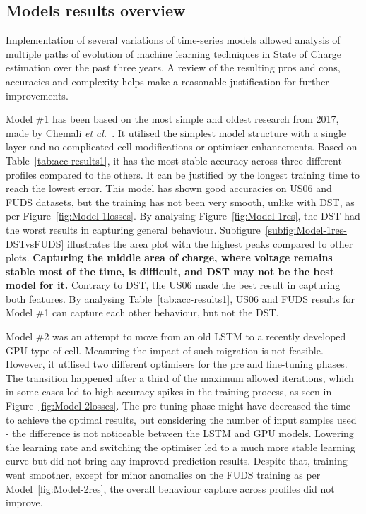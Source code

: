 %
%
\subsection{Models results overview}
Implementation of several variations of time-series models allowed analysis of multiple paths of evolution of machine learning techniques in State of Charge estimation over the past three years.
A review of the resulting pros and cons, accuracies and complexity helps make a reasonable justification for further improvements.

%
%
Model \#1 has been based on the most simple and oldest research from 2017, made by Chemali \textit{et al.}~\cite{Chemali2017}.
It utilised the simplest model structure with a single layer and no complicated cell modifications or optimiser enhancements.
Based on Table~\ref{tab:acc-results1}, it has the most stable accuracy across three different profiles compared to the others.
It can be justified by the longest training time to reach the lowest error.
This model has shown good accuracies on US06 and FUDS datasets, but the training has not been very smooth, unlike with DST, as per Figure~\ref{fig:Model-1losses}.
By analysing Figure~\ref{fig:Model-1res}, the DST had the worst results in capturing general behaviour.
Subfigure~\ref{subfig:Model-1res-DSTvsFUDS} illustrates the area plot with the highest peaks compared to other plots.
\textbf{Capturing the middle area of charge, where voltage remains stable most of the time, is difficult, and DST may not be the best model for it.}
Contrary to DST, the US06 made the best result in capturing both features.
By analysing Table~\ref{tab:acc-results1}, US06 and FUDS results for Model \#1 can capture each other behaviour, but not the DST.

%
%
Model \#2 was an attempt to move from an old LSTM to a recently developed GPU type of cell.
Measuring the impact of such migration is not feasible.
However, it utilised two different optimisers for the pre and fine-tuning phases.
The transition happened after a third of the maximum allowed iterations, which in some cases led to high accuracy spikes in the training process, as seen in Figure~\ref{fig:Model-2losses}.
The pre-tuning phase might have decreased the time to achieve the optimal results, but considering the number of input samples used - the difference is not noticeable between the LSTM and GPU models.
Lowering the learning rate and switching the optimiser led to a much more stable learning curve but did not bring any improved prediction results.
Despite that, training went smoother, except for minor anomalies on the FUDS training as per Model~\ref{fig:Model-2res}, the overall behaviour capture across profiles did not improve.

